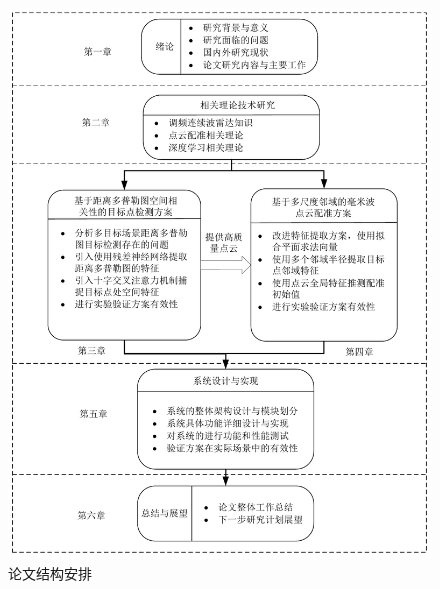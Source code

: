 \begin{figure}[htbp]
	\centering
	\includegraphics[width=0.95\linewidth]{figures/论文结构.pdf}
	\caption{论文结构安排}
	\label{fig:论文结构安排}
\end{figure}